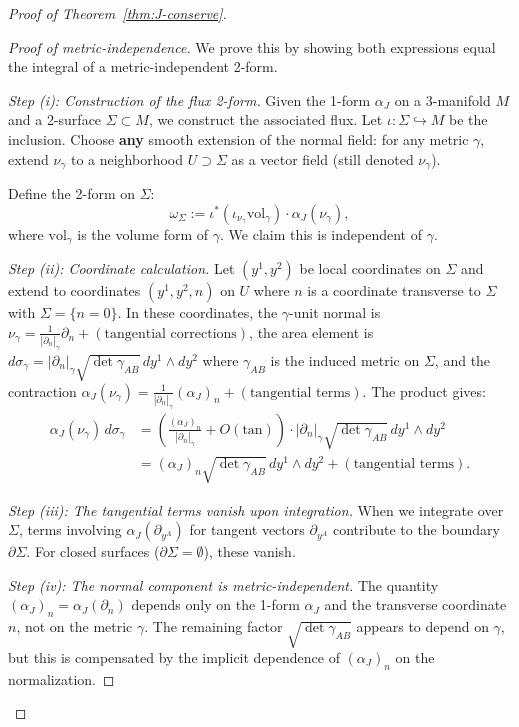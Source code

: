 \documentclass[12pt]{article}
\theoremstyle{plain}
\theoremstyle{definition}
\theoremstyle{remark}
\begin{document}
\begin{proof}[Proof of Theorem~\ref{thm:J-conserve}]
\begin{proof}[Proof of metric-independence]
We prove this by showing both expressions equal the integral of a metric-independent 2-form.

\textit{Step (i): Construction of the flux 2-form.} Given the 1-form $\alpha_J$ on a 3-manifold $M$ and a 2-surface $\Sigma \subset M$, we construct the associated flux. Let $\iota: \Sigma \hookrightarrow M$ be the inclusion. Choose \textbf{any} smooth extension of the normal field: for any metric $\gamma$, extend $\nu_\gamma$ to a neighborhood $U \supset \Sigma$ as a vector field (still denoted $\nu_\gamma$).

Define the 2-form on $\Sigma$:
\[
\omega_\Sigma := \iota^*(\iota_{\nu_\gamma} \text{vol}_\gamma) \cdot \alpha_J(\nu_\gamma),
\]
where $\text{vol}_\gamma$ is the volume form of $\gamma$. We claim this is independent of $\gamma$.

\textit{Step (ii): Coordinate calculation.} Let $(y^1, y^2)$ be local coordinates on $\Sigma$ and extend to coordinates $(y^1, y^2, n)$ on $U$ where $n$ is a coordinate transverse to $\Sigma$ with $\Sigma = \{n = 0\}$. In these coordinates, the $\gamma$-unit normal is $\nu_\gamma = \frac{1}{|\partial_n|_\gamma}\partial_n + (\text{tangential corrections})$, the area element is $d\sigma_\gamma = |\partial_n|_\gamma \sqrt{\det \gamma_{AB}} \, dy^1 \wedge dy^2$ where $\gamma_{AB}$ is the induced metric on $\Sigma$, and the contraction $\alpha_J(\nu_\gamma) = \frac{1}{|\partial_n|_\gamma}(\alpha_J)_n + (\text{tangential terms})$. The product gives:
\begin{align}
\alpha_J(\nu_\gamma) \, d\sigma_\gamma &= \left(\frac{(\alpha_J)_n}{|\partial_n|_\gamma} + O(\text{tan})\right) \cdot |\partial_n|_\gamma \sqrt{\det \gamma_{AB}} \, dy^1 \wedge dy^2 \\
&= (\alpha_J)_n \sqrt{\det \gamma_{AB}} \, dy^1 \wedge dy^2 + (\text{tangential terms}).
\end{align}

\textit{Step (iii): The tangential terms vanish upon integration.} When we integrate over $\Sigma$, terms involving $\alpha_J(\partial_{y^A})$ for tangent vectors $\partial_{y^A}$ contribute to the boundary $\partial \Sigma$. For closed surfaces ($\partial \Sigma = \emptyset$), these vanish.

\textit{Step (iv): The normal component is metric-independent.} The quantity $(\alpha_J)_n = \alpha_J(\partial_n)$ depends only on the 1-form $\alpha_J$ and the transverse coordinate $n$, not on the metric $\gamma$. The remaining factor $\sqrt{\det \gamma_{AB}}$ appears to depend on $\gamma$, but this is compensated by the implicit dependence of $(\alpha_J)_n$ on the normalization.


\end{proof}
\end{proof}
\end{document}

